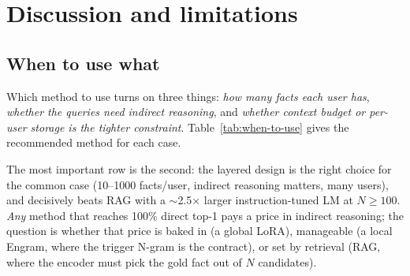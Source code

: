 \documentclass[letterpaper]{article} %
\begin{document}
\section{Discussion and limitations}
\label{sec:discussion}

\subsection{When to use what}
\label{sec:when-to-use}

Which method to use turns on three things: \emph{how many facts
each user has}, \emph{whether the queries need indirect
reasoning}, and \emph{whether context budget or per-user storage
is the tighter constraint}. Table~\ref{tab:when-to-use} gives the
recommended method for each case.

\begin{table}[h]
  \centering
  \caption{Cheat sheet for which method to use.
  ``invariant'' = the number does not
  degrade with KB / population size.}
  \label{tab:when-to-use}
\end{table}

The most important row is the second: the layered design is the right
choice for the common case (10--1000 facts/user, indirect
reasoning matters, many users), and decisively beats RAG with a
$\sim$2.5$\times$ larger instruction-tuned LM at $N \geq 100$.
\emph{Any} method that reaches 100\% direct top-1 pays a price in
indirect reasoning; the question is whether that price is baked
in (a global LoRA), manageable (a local Engram, where the trigger
N-gram is the contract), or set by retrieval (RAG, where the
encoder must pick the gold fact out of $N$ candidates).
\end{document}

